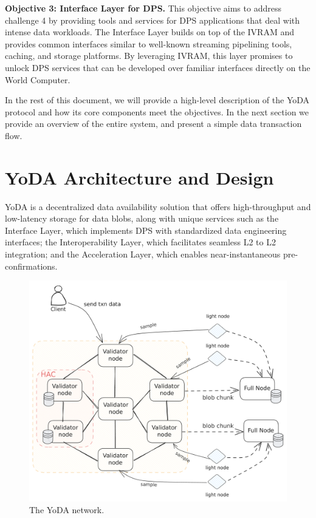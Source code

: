 \documentclass[11pt]{article}
\begin{document}
\noindent \textbf{Objective 3: Interface Layer for DPS.} This objective aims to address challenge 4 by providing tools and services for DPS applications that deal with intense data workloads. The Interface Layer builds on top of the IVRAM and provides common interfaces similar to well-known streaming pipelining tools, caching, and storage platforms. By leveraging IVRAM, this layer promises to unlock DPS services that can be developed over familiar interfaces directly on the World Computer.
\smallskip

In the rest of this document, we will provide a high-level description of the YoDA protocol and how its core components meet the objectives. In the next section we provide an overview of the entire system, and present a simple data transaction flow.

\section{YoDA Architecture and Design}
YoDA is a decentralized data availability solution that offers high-throughput and low-latency storage for data blobs, along with unique services such as the Interface Layer, which implements DPS with standardized data engineering interfaces; the Interoperability Layer, which facilitates seamless L2 to L2 integration; and the Acceleration Layer, which enables near-instantaneous pre-confirmations.

\begin{figure}[htp]
    \centering
    \includegraphics[scale=0.28]{images/yoda-net.pdf}
    \caption{The YoDA network.}
    \label{fig:yoda-net}
\end{figure}
\end{document}
